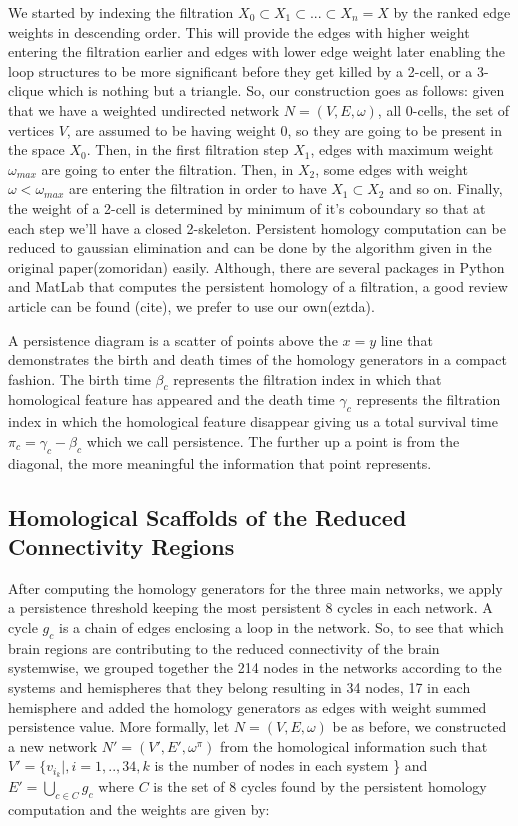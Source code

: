 \documentclass[9pt,twocolumn,twoside,lineno]{pnas-new}
\begin{document}
We started by indexing the filtration $X_{0}\subset X_{1}\subset ...\subset X_{n}=X$ by the ranked edge weights in descending order. This will provide the edges with higher weight entering the filtration earlier and edges with lower edge weight later enabling the loop structures to be more significant before they get killed by a 2-cell, or a 3-clique which is nothing but a triangle. So, our construction goes as follows: given that we have a weighted undirected network $N=(V,E,\omega)$, all 0-cells, the set of vertices $V$, are assumed to be having weight $0$, so they are going to be present in the space $X_{0}$. Then, in the first filtration step $X_{1}$, edges with maximum weight $\omega_{max}$ are going to enter the filtration. Then, in $X_{2}$, some edges with weight $\omega<\omega_{max}$ are entering the filtration in order to have $X_{1}\subset X_{2}$ and so on. Finally, the weight of a 2-cell is determined by minimum of it's coboundary so that at each step we'll have a closed 2-skeleton. Persistent homology computation can be reduced to gaussian elimination and can be done by the algorithm given in the original paper(zomoridan) easily. Although, there are several packages in Python and MatLab that computes the persistent homology of a filtration, a good review article can be found (cite), we prefer to use our own(eztda).

A persistence diagram is a scatter of points above the $x=y$ line that demonstrates the birth and death times of the homology generators in a compact fashion. The birth time $\beta_{c}$ represents the filtration index in which that homological feature has appeared and the death time $\gamma_{c}$ represents the filtration index in which the homological feature disappear giving us a total survival time $\pi_{c}=\gamma_{c}-\beta_{c}$ which we call persistence.  The further up a point is from the diagonal, the more meaningful the information that point represents.

\subsection{Homological Scaffolds of the Reduced Connectivity Regions}
After computing the homology generators for the three main networks, we apply a persistence threshold keeping the most persistent 8 cycles in each network. A cycle $g_{c}$ is a chain of edges enclosing a loop in the network. So, to see that which brain regions are contributing to the reduced connectivity of the brain systemwise, we grouped together the 214 nodes in the networks according to the systems and hemispheres that they belong resulting in 34 nodes, 17 in each hemisphere and added the homology generators as edges with weight summed persistence value. More formally, let $N=(V,E,\omega)$ be as before, we constructed a new network $N'=(V',E',\omega^{\pi})$ from the homological information such that $V'=\{v_{i_{k}}|,i=1,..,34, k $ is the number of nodes in each system \} and $E'=\bigcup_{c\in C}g_{c}$ where $C$ is the set of 8 cycles found by the persistent homology computation and the weights are given by:
\end{document}
